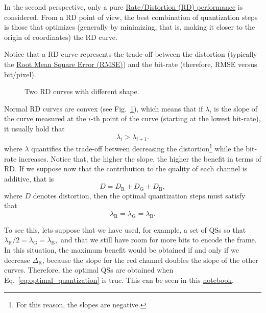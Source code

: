 In the second perspective, only a pure
\href{https://en.wikipedia.org/wiki/Rate-distortion_theory}{Rate/Distortion
  (RD) performance} is considered. From a RD point of view, the best
combination of quantization steps is those that optimizes (generally
by minimizing, that is, making it closer to the origin of coordinates)
the RD curve.

Notice that a RD curve represents the trade-off between the distortion
(typically the
\href{https://en.wikipedia.org/wiki/Root-mean-square_deviation}{Root
  Mean Square Error (RMSE)}) and the bit-rate (therefore, RMSE versus
bit/pixel).

\begin{figure}
  \centering
  \caption{Two RD curves with different shape.}
  \label{fig:RD_slopes}
\end{figure}

Normal RD curves are convex (see Fig.~\ref{fig:RD_slopes}), which
means that if $\lambda_i$ is the slope of the curve measured at the
$i$-th point of the curve (starting at the lowest bit-rate), it
usually hold that
\begin{equation}
  \lambda_i > \lambda_{i+1}.
\end{equation}
where $\lambda$ quantifies the trade-off between decreasing the
distortion\footnote{For this reason, the slopes are negative.} while
the bit-rate increases. Notice that, the higher the slope, the higher
the benefit in terms of RD. If we suppose now that the contribution to
the quality of each channel is additive, that is
\begin{equation}
  D = D_{\text{R}} + D_{\text{G}} + D_{\text{B}},
\end{equation}
where $D$ denotes distortion, then the optimal quantization steps must
satisfy that~\cite{vetterli1995wavelets,sayood2017introduction}
\begin{equation}
  \lambda_{\text{R}} = \lambda_{\text{G}} = \lambda_{\text{B}}.
  \label{eq:optimal_quantization}
\end{equation}

To see this, lets suppose that we have used, for example, a set of QSs
so that
$\lambda_{\text{R}}/2 = \lambda_{\text{G}} = \lambda_{\text{B}},$ and
that we still have room for more bits to encode the frame. In this
situation, the maximum benefit would be obtained if and only if we
decrease $\Delta_{\text{R}}$, because the slope for the red channel
doubles the slope of the other curves. Therefore, the optimal QSs are
obtained when Eq.~\ref{eq:optimal_quantization} is true. This can be
seen in this
\href{https://github.com/Sistemas-Multimedia/Sistemas-Multimedia.github.io/blob/master/milestones/05-RGB_compression/RGB_compression.ipynb}{notebook}.

